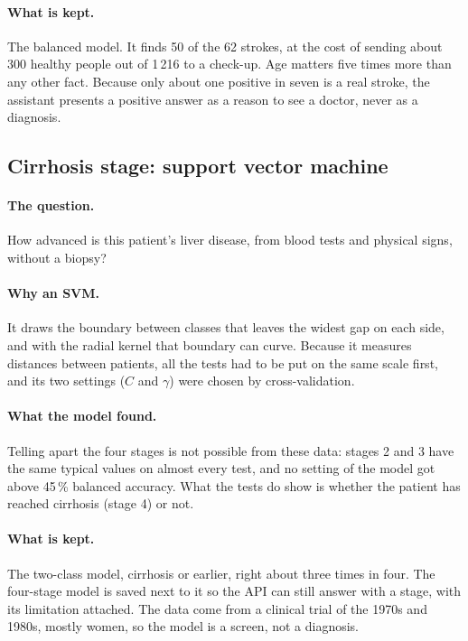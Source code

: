 \paragraph{What is kept.} The balanced model. It finds 50 of the 62
strokes, at the cost of sending about 300 healthy people out of 1\,216 to a
check-up. Age matters five times more than any other fact. Because only
about one positive in seven is a real stroke, the assistant presents a
positive answer as a reason to see a doctor, never as a diagnosis.

\subsection{Cirrhosis stage: support vector machine}

\paragraph{The question.} How advanced is this patient's liver disease,
from blood tests and physical signs, without a biopsy?

\paragraph{Why an SVM.} It draws the boundary between classes that leaves
the widest gap on each side, and with the radial kernel that boundary can
curve. Because it measures distances between patients, all the tests had to
be put on the same scale first, and its two settings ($C$ and $\gamma$)
were chosen by cross-validation.

\paragraph{What the model found.} Telling apart the four stages is not
possible from these data: stages 2 and 3 have the same typical values on
almost every test, and no setting of the model got above 45\,\% balanced
accuracy. What the tests do show is whether the patient has reached
cirrhosis (stage 4) or not.

\paragraph{What is kept.} The two-class model, cirrhosis or earlier, right
about three times in four. The four-stage model is saved next to it so the
API can still answer with a stage, with its limitation attached. The data
come from a clinical trial of the 1970s and 1980s, mostly women, so the
model is a screen, not a diagnosis.

